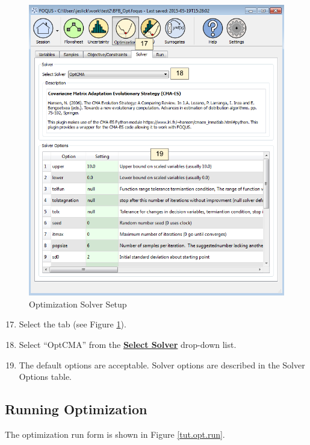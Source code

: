 \begin{figure}[H] 
	\begin{center}
		\includegraphics[scale=0.55]{Chapt_optimization/figs/optSolver}
		\caption{Optimization Solver Setup}
		\label{tut.opt.solver}
	\end{center}
\end{figure}

\begin{enumerate}
	\setcounter{enumi}{16}
	\item Select the  tab (see Figure \ref{tut.opt.solver}).
	\item Select ``OptCMA'' from the \textbf{\underline{Select Solver}} drop-down list.
	\item The default options are acceptable. Solver options are described in the Solver Options table.
\end{enumerate}

\subsection{Running Optimization}

The optimization run form is shown in Figure \ref{tut.opt.run}. 

